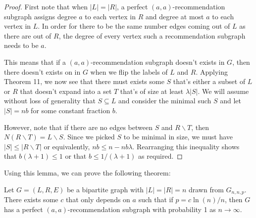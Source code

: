\begin{proof}
First note that when $|L|=|R|$, a perfect $(a,a)$-recommendation subgraph assigns degree $a$ to each vertex in $R$ and degree at most $a$ to each vertex in $L$. In order for there to be the same number edges coming out of $L$ as there are out of $R$, the degree of every vertex such a recommendation subgraph needs to be $a$.\vs

This means that if a $(a,a)$-recommendation subgraph doesn't exists in $G$, then there doesn't exists on in $G$ when we flip the labels of $L$ and $R$. Applying Theorem 11, we now see that there must exists some $S$ that's either a subset of $L$ or $R$ that doesn't expand into a set $T$ that's of size at least $\lambda|S|$. We will assume without loss of generality that $S\subseteq L$ and consider the minimal such $S$ and let $|S|=nb$ for some constant fraction $b$. \vs

However, note that if there are no edges between $S$ and $R\backslash T$, then $N(R\backslash T) = L\backslash S$. Since we picked $S$ to be minimal in size, we must have $|S|\leq |R\backslash T|$ or equivalently, $nb \leq n -nb\lambda$. Rearranging this inequality shows that $b(\lambda+1) \leq 1$ or that $b\leq 1/(\lambda+1)$ as required.
\end{proof}

Using this lemma, we can prove the following theorem:

\begin{thm} 
Let $G=(L,R,E)$ be a bipartite graph with $|L|=|R|=n$ drawn from $G_{n,n,p}$. There exists some $c$ that only depends on $a$ such that if $p=c\ln(n)/n$, then $G$ has a perfect $(a,a)$-recommendation subgraph with probability 1 as $n\to\infty$.
\end{thm}

